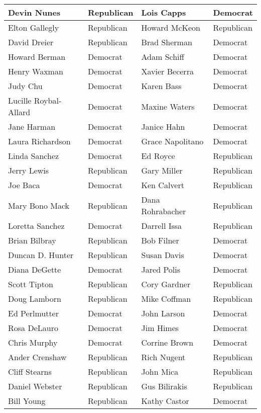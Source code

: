 \documentclass[10pt,11pt,12pt,oneside]{book}
\begin{document}
\begin{appendices}
\begin{table}[H]
\begin{tabular}{|p{2in}|p{0.5in}||p{2in}|p{0.5in}|}
		Devin Nunes & Republican & Lois Capps & Democrat\\ \hline
		Elton Gallegly & Republican & Howard McKeon & Republican\\ \hline
		David Dreier & Republican & Brad Sherman & Democrat\\ \hline
		Howard Berman & Democrat & Adam Schiff & Democrat\\ \hline
		Henry Waxman & Democrat & Xavier Becerra & Democrat\\ \hline
		Judy Chu & Democrat & Karen Bass & Democrat\\ \hline
		Lucille Roybal-Allard & Democrat & Maxine Waters & Democrat\\ \hline
		Jane Harman & Democrat & Janice Hahn & Democrat\\ \hline
		Laura Richardson & Democrat & Grace Napolitano & Democrat\\ \hline
		Linda Sanchez & Democrat & Ed Royce & Republican\\ \hline
		Jerry Lewis & Republican & Gary Miller & Republican\\ \hline
		Joe Baca & Democrat & Ken Calvert & Republican\\ \hline
		Mary Bono Mack & Republican & Dana Rohrabacher & Republican\\ \hline
		Loretta Sanchez & Democrat & Darrell Issa & Republican\\ \hline
		Brian Bilbray & Republican & Bob Filner & Democrat\\ \hline
		Duncan D. Hunter & Republican & Susan Davis & Democrat\\ \hline
		Diana DeGette & Democrat & Jared Polis & Democrat\\ \hline
		Scott Tipton & Republican & Cory Gardner & Republican\\ \hline
		Doug Lamborn & Republican & Mike Coffman & Republican\\ \hline
		Ed Perlmutter & Democrat & John Larson & Democrat\\ \hline
		Rosa DeLauro & Democrat & Jim Himes & Democrat\\ \hline
		Chris Murphy & Democrat & Corrine Brown & Democrat\\ \hline
		Ander Crenshaw & Republican & Rich Nugent & Republican\\ \hline
		Cliff Stearns & Republican & John Mica & Republican\\ \hline
		Daniel Webster & Republican & Gus Bilirakis & Republican\\ \hline
		Bill Young & Republican & Kathy Castor & Democrat\\ \hline

\end{tabular}
\end{table}
\end{appendices}
\end{document}
